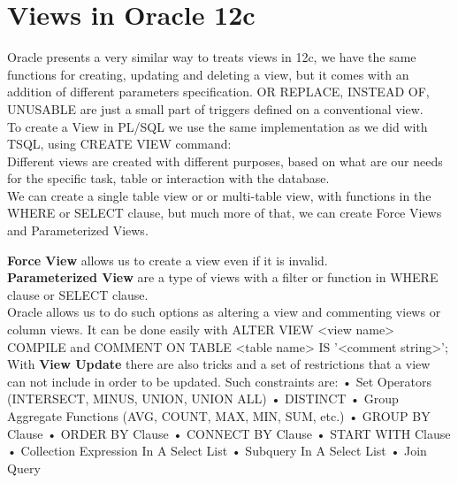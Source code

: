 \section{Views in Oracle 12c}

Oracle presents a very similar way to treats views in 12c, we have the same functions for creating, updating and deleting a view, but it comes with an addition of different parameters specification. OR REPLACE, INSTEAD OF, UNUSABLE are just a small part of triggers defined on a conventional view.\\
To create a View in PL/SQL we use the same implementation as we did with TSQL, using CREATE VIEW command:\\


Different views are created with different purposes, based on what are our needs for the specific task, table or interaction with the database.\\
We can create a single table view or or multi-table view, with functions in the WHERE or SELECT clause, but much more of that, we can create Force Views and Parameterized Views.

\textbf{Force View} allows us to create a view even if it is invalid.\\


\textbf{Parameterized View} are a type of views with a filter or function in WHERE clause or SELECT clause.\\


Oracle allows us to do such options as altering a view and commenting views or column views. It can be done easily with ALTER VIEW <view name> COMPILE and 
COMMENT ON TABLE <table name> IS '<comment string>';\\
With \textbf{View Update} there are also tricks and a set of restrictions that a view can not include in order to be updated. Such constraints are:
• Set Operators (INTERSECT, MINUS, UNION, UNION ALL)
• DISTINCT
• Group Aggregate Functions (AVG, COUNT, MAX, MIN, SUM, etc.)
• GROUP BY Clause
• ORDER BY Clause
• CONNECT BY Clause
• START WITH Clause
• Collection Expression In A Select List
• Subquery In A Select List
• Join Query\\


